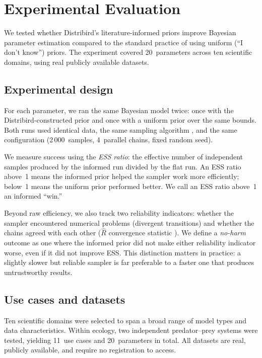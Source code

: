 \documentclass[11pt,a4paper]{article}
\begin{document}
\section{Experimental Evaluation}
\label{sec:exp-eval}

We tested whether Distribird's literature-informed priors improve Bayesian parameter estimation compared to the standard practice of using uniform (``I don't know'') priors. The experiment covered 20~parameters across ten scientific domains, using real publicly available datasets.

\subsection{Experimental design}

For each parameter, we ran the same Bayesian model twice: once with the Distribird-constructed prior and once with a uniform prior over the same bounds. Both runs used identical data, the same sampling algorithm \citep[NUTS;][]{Hoffman2014}, and the same configuration (2\,000~samples, 4~parallel chains, fixed random seed).

We measure success using the \emph{ESS ratio}: the effective number of independent samples produced by the informed run divided by the flat run. An ESS ratio above~1 means the informed prior helped the sampler work more efficiently; below~1 means the uniform prior performed better. We call an ESS ratio above~1 an informed ``win.''

Beyond raw efficiency, we also track two reliability indicators: whether the sampler encountered numerical problems (divergent transitions) and whether the chains agreed with each other ($\hat{R}$ convergence statistic \citep{Vehtari2021}). We define a \emph{no-harm} outcome as one where the informed prior did not make either reliability indicator worse, even if it did not improve ESS. This distinction matters in practice: a slightly slower but reliable sampler is far preferable to a faster one that produces untrustworthy results.

\subsection{Use cases and datasets}
\label{sec:usecases}

Ten scientific domains were selected to span a broad range of model types and data characteristics. Within ecology, two independent predator--prey systems were tested, yielding 11~use cases and 20~parameters in total. All datasets are real, publicly available, and require no registration to access.
\end{document}
